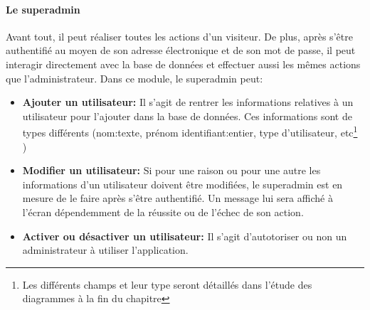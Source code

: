         \paragraph{Le superadmin}
        Avant tout, il peut réaliser toutes les actions d'un visiteur. De plus, après s'être authentifié au moyen de 
        son adresse électronique et de son mot de passe, il peut interagir directement avec la base de données et 
        effectuer aussi les mêmes actions que l'administrateur.
        Dans ce module, le superadmin peut:
        \begin{itemize}
                \item \textbf{Ajouter un utilisateur: }
                Il s'agit de rentrer les informations relatives à un utilisateur pour l'ajouter dans la base de données.
                Ces informations sont de types différents (nom:texte, prénom identifiant:entier, type d'utilisateur, 
                etc\footnote{Les différents champs et leur type seront 
                détaillés dans l'étude des diagrammes à la fin du chapitre} )
                \item \textbf{Modifier un utilisateur: }
                Si pour une raison ou pour une autre les informations d'un utilisateur doivent être modifiées, le superadmin est en
                mesure de le faire après s'être authentifié. Un message lui sera affiché à l'écran dépendemment 
                de la réussite ou de l'échec de son action.
                \item \textbf{Activer ou désactiver un utilisateur: }
                Il s'agit d'autotoriser ou non un administrateur à utiliser l'application.
        \end{itemize}
          

